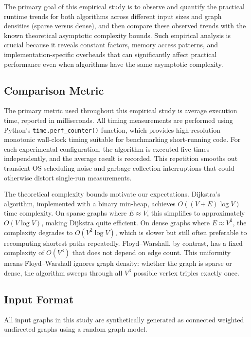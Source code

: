 \documentclass[12pt]{article}
\begin{document}
The primary goal of this empirical study is to observe and quantify the practical runtime trends
for both algorithms across different input sizes and graph densities (sparse versus dense), and
then compare these observed trends with the known theoretical asymptotic complexity bounds. Such
empirical analysis is crucial because it reveals constant factors, memory access patterns, and
implementation-specific overheads that can significantly affect practical performance even when
algorithms have the same asymptotic complexity.

\subsection{Comparison Metric}

The primary metric used throughout this empirical study is average execution time, reported
in milliseconds. All timing measurements are performed using Python's \texttt{time.perf\_counter()}
function, which provides high-resolution monotonic wall-clock timing suitable for benchmarking short-running
code. For each experimental configuration, the algorithm is executed five times independently, and the
average result is recorded. This repetition smooths out transient OS scheduling noise and garbage-collection
interruptions that could otherwise distort single-run measurements.

The theoretical complexity bounds motivate our expectations. Dijkstra's algorithm, implemented with a binary
min-heap, achieves $O((V+E)\log V)$ time complexity. On sparse graphs where $E \approx V$, this simplifies
to approximately $O(V \log V)$, making Dijkstra quite efficient. On dense graphs where $E \approx V^2$,
the complexity degrades to $O(V^2 \log V)$, which is slower but still often preferable to recomputing
shortest paths repeatedly. Floyd--Warshall, by contrast, has a fixed complexity of $O(V^3)$ that does
not depend on edge count. This uniformity means Floyd--Warshall ignores graph density: whether the graph
is sparse or dense, the algorithm sweeps through all $V^3$ possible vertex triples exactly once.

\subsection{Input Format}

All input graphs in this study are synthetically generated as connected weighted undirected graphs
using a random graph model.
\end{document}
